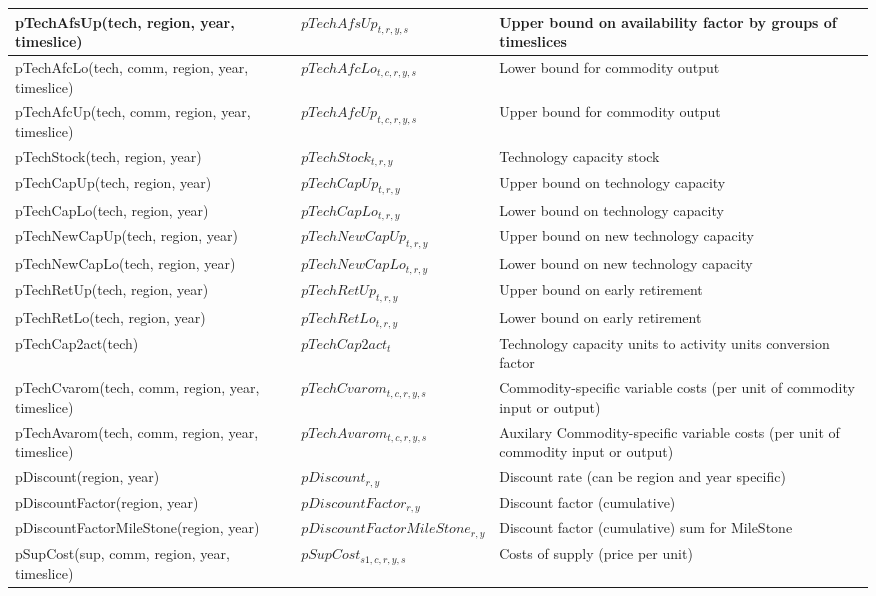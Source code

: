\documentclass{article}
\begin{document}
\begin{longtable}{|p{10cm}|p{5cm}|p{9cm}|}
 \hline
pTechAfsUp(tech, region, year, timeslice) & $pTechAfsUp_{t,r,y,s}$ & Upper bound on availability factor by groups of timeslices \\
 \hline
pTechAfcLo(tech, comm, region, year, timeslice) & $pTechAfcLo_{t,c,r,y,s}$ & Lower bound for commodity output \\
 \hline
pTechAfcUp(tech, comm, region, year, timeslice) & $pTechAfcUp_{t,c,r,y,s}$ & Upper bound for commodity output \\
 \hline
pTechStock(tech, region, year) & $pTechStock_{t,r,y}$ & Technology capacity stock \\
 \hline
pTechCapUp(tech, region, year) & $pTechCapUp_{t,r,y}$ & Upper bound on technology capacity \\
 \hline
pTechCapLo(tech, region, year) & $pTechCapLo_{t,r,y}$ & Lower bound on technology capacity \\
 \hline
pTechNewCapUp(tech, region, year) & $pTechNewCapUp_{t,r,y}$ & Upper bound on new technology capacity \\
 \hline
pTechNewCapLo(tech, region, year) & $pTechNewCapLo_{t,r,y}$ & Lower bound on new technology capacity \\
 \hline
pTechRetUp(tech, region, year) & $pTechRetUp_{t,r,y}$ & Upper bound on early retirement \\
 \hline
pTechRetLo(tech, region, year) & $pTechRetLo_{t,r,y}$ & Lower bound on early retirement \\
 \hline
pTechCap2act(tech) & $pTechCap2act_{t}$ & Technology capacity units to activity units conversion factor \\
 \hline
pTechCvarom(tech, comm, region, year, timeslice) & $pTechCvarom_{t,c,r,y,s}$ & Commodity-specific variable costs (per unit of commodity input or output) \\
 \hline
pTechAvarom(tech, comm, region, year, timeslice) & $pTechAvarom_{t,c,r,y,s}$ & Auxilary Commodity-specific variable costs (per unit of commodity input or output) \\
 \hline
pDiscount(region, year) & $pDiscount_{r,y}$ & Discount rate (can be region and year specific) \\
 \hline
pDiscountFactor(region, year) & $pDiscountFactor_{r,y}$ & Discount factor (cumulative) \\
 \hline
pDiscountFactorMileStone(region, year) & $pDiscountFactorMileStone_{r,y}$ & Discount factor (cumulative) sum for MileStone \\
 \hline
pSupCost(sup, comm, region, year, timeslice) & $pSupCost_{s1,c,r,y,s}$ & Costs of supply (price per unit) \\

\end{longtable}
\end{document}
